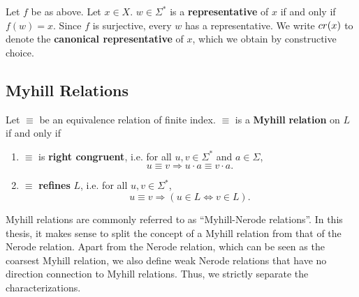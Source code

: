 
\begin{definition}
    Let $f$ be as above. 
    Let $x \in X$. $w \in \Sigma^*$ is a \textbf{representative} of $x$ if and only if $f(w) = x$.
    Since $f$ is surjective, every $w$ has a representative. 
    We write $cr(x)$ to denote the \textbf{canonical representative} of $x$, which we obtain by constructive choice.
\end{definition}




\subsection{Myhill Relations}

\begin{definition} 
    \label{Myhill}
    Let $\equiv$ be an equivalence relation of finite index. $\equiv$ is a \textbf{Myhill}%
    \textbf{relation} \cite{DBLP:books/daglib/0088160} on $L$ if and only if

\begin{enumerate}[label=(\roman*)]

    \item\label{right_congruent}
        $\equiv$ is \textbf{right congruent}, i.e. for all $u, v \in \Sigma^*$ and $a \in \Sigma$,
        \begin{equation*}
            u \equiv v \Rightarrow
            u \cdot a \equiv v \cdot a.
        \end{equation*}


    \item\label{refinement}
        $\equiv$ \textbf{refines} $L$, i.e. for all $u,v \in \Sigma^*$,
        \begin{equation*}
            u \equiv v \Rightarrow
            (u \in L \iff v \in L).
        \end{equation*}

\end{enumerate}
\end{definition}

Myhill relations are commonly referred to as ``Myhill-Nerode relations''. 
In this thesis, it makes sense to split the concept of a Myhill relation from that of the Nerode relation.
Apart from the Nerode relation, which can be seen as the coarsest Myhill relation, we also define
weak Nerode relations that have no direction connection to Myhill relations.
Thus, we strictly separate the characterizations.


